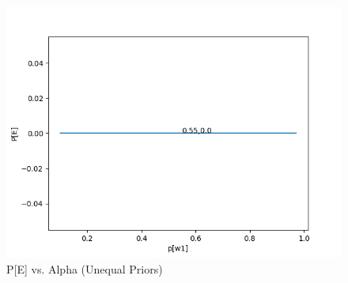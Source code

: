 \documentclass{article}
\begin{document}
\begin{figure}[!htb]
	\begin{minipage}{0.99\textwidth}
		\centering
		\includegraphics[width=1\linewidth]{../changingpriors/results.png}
		\caption{P[E] vs. Alpha (Unequal Priors)}
	\end{minipage}
\end{figure}
\clearpage
\pagebreak
\end{document}
